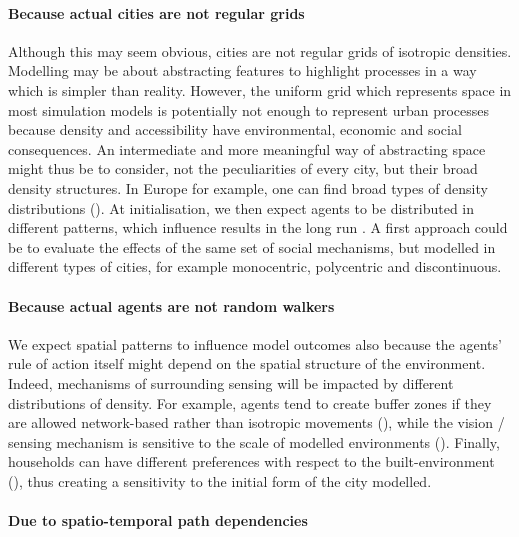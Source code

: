\documentclass[Afour,sageh,times]{sagej}
\begin{document}
\paragraph{Because actual cities are not regular grids}
Although this may seem obvious, cities are not regular grids of isotropic densities. Modelling may be about abstracting features to highlight processes in a way which is simpler than reality. However, the uniform grid which represents space in most simulation models is potentially not enough to represent urban processes because density and accessibility have environmental, economic and social consequences. An intermediate and more meaningful way of abstracting space might thus be to consider, not the peculiarities of every city, but their broad density structures. In Europe for example, one can find broad types of density distributions (\cite{LeNechet2015}). At initialisation, we then expect agents to be distributed in different patterns, which influence results in the long run \cite{Castellanoetal2009}. A first approach could be to evaluate the effects of the same set of social mechanisms, but modelled in different types of cities, for example monocentric, polycentric and discontinuous.

\paragraph{Because actual agents are not random walkers}
We expect spatial patterns to influence model outcomes also because the agents' rule of action itself might depend on the spatial structure of the environment. Indeed, mechanisms of surrounding sensing will be impacted by different distributions of density. For example, agents tend to create buffer zones if they are allowed network-based rather than isotropic movements (\cite{Banos2012}), while the vision / sensing mechanism is sensitive to the scale of modelled environments (\cite{LauriJaggi2003, FossettDietrich2009}). Finally, households can have different preferences with respect to the built-environment (\cite{SpielmanHarrison2014}), thus creating a sensitivity to the initial form of the city modelled.

\paragraph{Due to spatio-temporal path dependencies}
\end{document}
